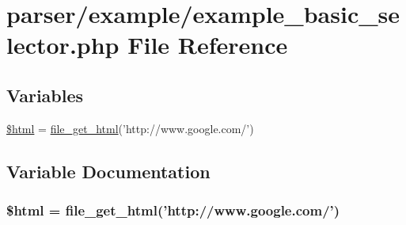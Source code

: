 \hypertarget{example__basic__selector_8php}{\section{parser/example/example\+\_\+basic\+\_\+selector.php File Reference}
\label{example__basic__selector_8php}
}
\subsection*{Variables}
\begin{DoxyCompactItemize}
\item 
\hyperlink{example__basic__selector_8php_a6f96e7fc92441776c9d1cd3386663b40}{\$html} = \hyperlink{simple__html__dom_8php_af2164941db8b68168c1105687e179d27}{file\+\_\+get\+\_\+html}('http\+://www.\+google.\+com/')
\end{DoxyCompactItemize}


\subsection{Variable Documentation}
\hypertarget{example__basic__selector_8php_a6f96e7fc92441776c9d1cd3386663b40}{
\subsubsection[{\$html}]{\setlength{\rightskip}{0pt plus 5cm}\$html = {\bf file\+\_\+get\+\_\+html}('http\+://www.\+google.\+com/')}}\label{example__basic__selector_8php_a6f96e7fc92441776c9d1cd3386663b40}
